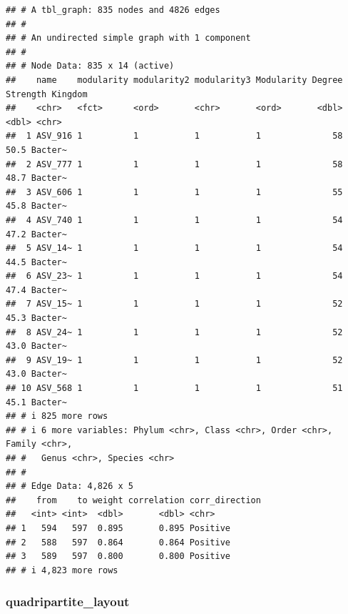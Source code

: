 \documentclass[
]{book}
\newenvironment{Shaded}{\begin{snugshade}}{\end{snugshade}}
\newcommand{\AttributeTok}[1]{\textcolor[rgb]{0.13,0.29,0.53}{#1}}
\newcommand{\DecValTok}[1]{\textcolor[rgb]{0.00,0.00,0.81}{#1}}
\newcommand{\FunctionTok}[1]{\textcolor[rgb]{0.13,0.29,0.53}{\textbf{#1}}}
\newcommand{\NormalTok}[1]{#1}
\newcommand{\OtherTok}[1]{\textcolor[rgb]{0.56,0.35,0.01}{#1}}
\newcommand{\SpecialCharTok}[1]{\textcolor[rgb]{0.81,0.36,0.00}{\textbf{#1}}}
\newcommand{\StringTok}[1]{\textcolor[rgb]{0.31,0.60,0.02}{#1}}
\begin{document}
\begin{verbatim}
## # A tbl_graph: 835 nodes and 4826 edges
## #
## # An undirected simple graph with 1 component
## #
## # Node Data: 835 x 14 (active)
##    name    modularity modularity2 modularity3 Modularity Degree Strength Kingdom
##    <chr>   <fct>      <ord>       <chr>       <ord>       <dbl>    <dbl> <chr>  
##  1 ASV_916 1          1           1           1              58     50.5 Bacter~
##  2 ASV_777 1          1           1           1              58     48.7 Bacter~
##  3 ASV_606 1          1           1           1              55     45.8 Bacter~
##  4 ASV_740 1          1           1           1              54     47.2 Bacter~
##  5 ASV_14~ 1          1           1           1              54     44.5 Bacter~
##  6 ASV_23~ 1          1           1           1              54     47.4 Bacter~
##  7 ASV_15~ 1          1           1           1              52     45.3 Bacter~
##  8 ASV_24~ 1          1           1           1              52     43.0 Bacter~
##  9 ASV_19~ 1          1           1           1              52     43.0 Bacter~
## 10 ASV_568 1          1           1           1              51     45.1 Bacter~
## # i 825 more rows
## # i 6 more variables: Phylum <chr>, Class <chr>, Order <chr>, Family <chr>,
## #   Genus <chr>, Species <chr>
## #
## # Edge Data: 4,826 x 5
##    from    to weight correlation corr_direction
##   <int> <int>  <dbl>       <dbl> <chr>         
## 1   594   597  0.895       0.895 Positive      
## 2   588   597  0.864       0.864 Positive      
## 3   589   597  0.800       0.800 Positive      
## # i 4,823 more rows
\end{verbatim}

\subsubsection{quadripartite\_layout}\label{quadripartite_layout}

\begin{Shaded}
\end{Shaded}
\end{document}
